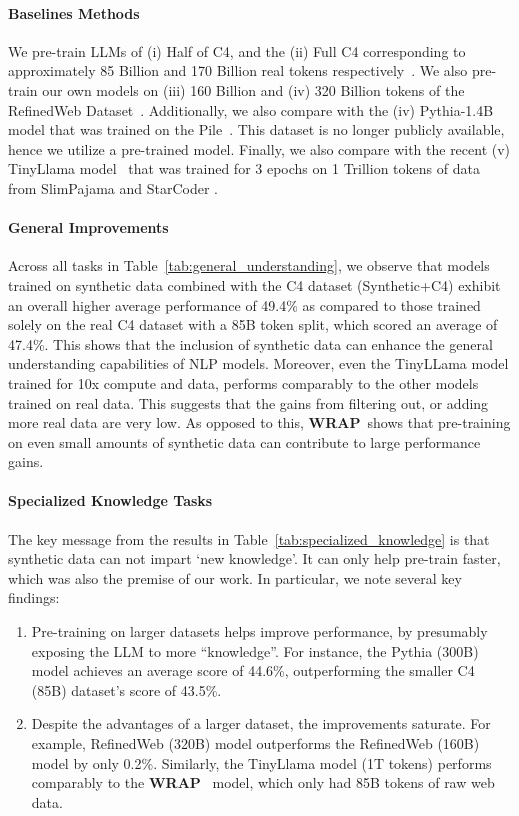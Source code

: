\documentclass[table]{article}
\newcommand{\ours}{\textbf{WRAP}}
\begin{document}
\paragraph{Baselines Methods}
We pre-train LLMs of 
(i) Half of C4, and the (ii) Full C4 corresponding to approximately
85 Billion and 170 Billion real tokens respectively~\citep{raffel2020exploring}. We also pre-train our own models on (iii) 160 Billion and (iv) 320 Billion tokens of the RefinedWeb Dataset~\citep{penedo2023refinedweb}. Additionally, we also compare with the (iv) Pythia-1.4B model that was trained on the Pile~\citep{gao2020pile}. This dataset is no longer publicly available, hence we utilize a pre-trained model. Finally, we also compare with the recent (v) TinyLlama model~\citep{zhang2024tinyllama} that was trained for 3 epochs  on 1 Trillion tokens of data from 
SlimPajama \citep{shen2023slimpajama} and StarCoder \citep{li2023starcoder}.

\paragraph{General Improvements}
Across all tasks in Table~\ref{tab:general_understanding}, we observe that models trained on synthetic data combined with the C4 dataset (Synthetic+C4) exhibit an overall higher average performance of 49.4\% as compared to those trained solely on the real C4 dataset with a 85B token split, which scored an average of 47.4\%. This shows that the inclusion of synthetic data can enhance the general understanding capabilities of NLP models. Moreover, even the TinyLLama model trained for 10x compute and data, performs comparably to the other models trained on real data. This suggests that the gains from filtering out, or adding more real data are very low. As opposed to this, \ours~shows that pre-training on even small amounts of synthetic data can contribute to large performance gains.

\paragraph{Specialized Knowledge Tasks} 
The key message from the results
in Table~\ref{tab:specialized_knowledge} is that synthetic data can not impart `new knowledge'. It can only help pre-train faster, which was also the premise of our work. In particular, we note several key findings:
\begin{enumerate}
    \item Pre-training on larger datasets helps improve performance, by presumably exposing the LLM to more ``knowledge''. For instance, the Pythia (300B) model achieves an average score of 44.6\%, outperforming the smaller C4 (85B) dataset's score of 43.5\%.
    \item Despite the advantages of a larger dataset, the improvements saturate. For example, RefinedWeb (320B) model outperforms the RefinedWeb (160B) model by only 0.2\%. Similarly, the TinyLlama model (1T tokens) performs comparably to the \ours~ model, which only had 85B tokens of raw web data.
\end{enumerate}
\end{document}
